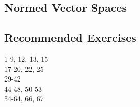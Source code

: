 \documentclass[hidelinks]{article}
\theoremstyle{definition}
\theoremstyle{plain}
\theoremstyle{remark}
\begin{document}
\subsection{Normed Vector Spaces}










\subsection{Recommended Exercises}
1-9, 12, 13, 15 \\
17-20, 22, 25 \\
29-42 \\
44-48, 50-53 \\
54-64, 66, 67 \\
\end{document}
